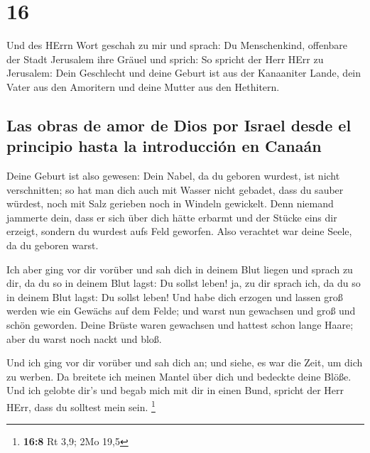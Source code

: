 \hypertarget{section-15}{%
\section{16}\label{section-15}}

 Und des HErrn Wort geschah zu mir und sprach:
 Du Menschenkind, offenbare der Stadt Jerusalem ihre
Gräuel und sprich:  So spricht der Herr HErr zu Jerusalem:
Dein Geschlecht und deine Geburt ist aus der Kanaaniter Lande, dein
Vater aus den Amoritern und deine Mutter aus den Hethitern.

\hypertarget{las-obras-de-amor-de-dios-por-israel-desde-el-principio-hasta-la-introducciuxf3n-en-canauxe1n}{%
\subsection{Las obras de amor de Dios por Israel desde el principio
hasta la introducción en
Canaán}\label{las-obras-de-amor-de-dios-por-israel-desde-el-principio-hasta-la-introducciuxf3n-en-canauxe1n}}

 Deine Geburt ist also gewesen: Dein Nabel, da du geboren
wurdest, ist nicht verschnitten; so hat man dich auch mit Wasser nicht
gebadet, dass du sauber würdest, noch mit Salz gerieben noch in Windeln
gewickelt.  Denn niemand jammerte dein, dass er sich über
dich hätte erbarmt und der Stücke eins dir erzeigt, sondern du wurdest
aufs Feld geworfen. Also verachtet war deine Seele, da du geboren warst.

 Ich aber ging vor dir vorüber und sah dich in deinem Blut
liegen und sprach zu dir, da du so in deinem Blut lagst: Du sollst
leben! ja, zu dir sprach ich, da du so in deinem Blut lagst: Du sollst
leben!  Und habe dich erzogen und lassen groß werden wie
ein Gewächs auf dem Felde; und warst nun gewachsen und groß und schön
geworden. Deine Brüste waren gewachsen und hattest schon lange Haare;
aber du warst noch nackt und bloß.

 Und ich ging vor dir vorüber und sah dich an; und siehe,
es war die Zeit, um dich zu werben. Da breitete ich meinen Mantel über
dich und bedeckte deine Blöße. Und ich gelobte dir's und begab mich mit
dir in einen Bund, spricht der Herr HErr, dass du solltest mein sein.
\footnote{\textbf{16:8} Rt 3,9; 2Mo 19,5}

